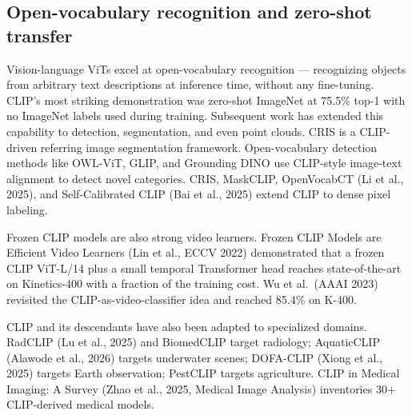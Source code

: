 \documentclass{article}
\begin{document}
\subsection{Open-vocabulary recognition and zero-shot transfer}\label{open-vocabulary-recognition-and-zero-shot-transfer}

Vision-language ViTs excel at open-vocabulary recognition --- recognizing objects from arbitrary text descriptions at inference time, without any fine-tuning. CLIP's most striking demonstration was zero-shot ImageNet at 75.5\% top-1 with no ImageNet labels used during training. Subsequent work has extended this capability to detection, segmentation, and even point clouds. CRIS \citep{wang2022pvtv2improvedbasel} is a CLIP-driven referring image segmentation framework. Open-vocabulary detection methods like OWL-ViT, GLIP, and Grounding DINO use CLIP-style image-text alignment to detect novel categories. CRIS, MaskCLIP, OpenVocabCT (Li et al., 2025), and Self-Calibrated CLIP (Bai et al., 2025) extend CLIP to dense pixel labeling.

Frozen CLIP models are also strong video learners. Frozen CLIP Models are Efficient Video Learners (Lin et al., ECCV 2022) demonstrated that a frozen CLIP ViT-L/14 plus a small temporal Transformer head reaches state-of-the-art on Kinetics-400 with a fraction of the training cost. Wu et al.~(AAAI 2023) revisited the CLIP-as-video-classifier idea and reached 85.4\% on K-400.

CLIP and its descendants have also been adapted to specialized domains. RadCLIP (Lu et al., 2025) and BiomedCLIP target radiology; AquaticCLIP (Alawode et al., 2026) targets underwater scenes; DOFA-CLIP (Xiong et al., 2025) targets Earth observation; PestCLIP targets agriculture. CLIP in Medical Imaging: A Survey (Zhao et al., 2025, Medical Image Analysis) inventories 30+ CLIP-derived medical models.
\end{document}
